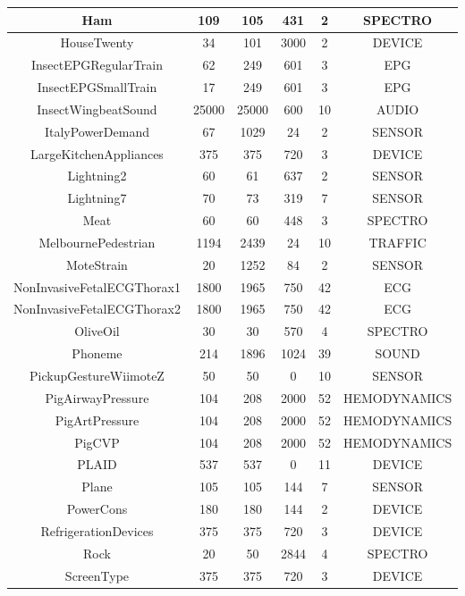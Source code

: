 \begin{table}
\begin{center}
\begin{longtable}{||c|c|c|c|c|c||}
 \hline
 Ham & 109 & 105 & 431 & 2 & SPECTRO \\[1ex]
 \hline
 HouseTwenty & 34 & 101 & 3000 & 2 & DEVICE \\[1ex]
 \hline
 InsectEPGRegularTrain & 62 & 249 & 601 & 3 & EPG \\[1ex]
 \hline
 InsectEPGSmallTrain & 17 & 249 & 601 & 3 & EPG \\[1ex]
 \hline
 InsectWingbeatSound & 25000 & 25000 & 600 & 10 & AUDIO \\[1ex]
 \hline
 ItalyPowerDemand & 67 & 1029 & 24 & 2 & SENSOR \\[1ex]
 \hline
 LargeKitchenAppliances & 375 & 375 & 720 & 3 & DEVICE \\[1ex]
 \hline
 Lightning2 & 60 & 61 & 637 & 2 & SENSOR \\[1ex]
 \hline
 Lightning7 & 70 & 73 & 319 & 7 & SENSOR \\[1ex]
 \hline
 Meat & 60 & 60 & 448 & 3 & SPECTRO \\[1ex]
 \hline
 MelbournePedestrian & 1194 & 2439 & 24 & 10 & TRAFFIC \\[1ex]
 \hline
 MoteStrain & 20 & 1252 & 84 & 2 & SENSOR \\[1ex]
 \hline
 NonInvasiveFetalECGThorax1 & 1800 & 1965 & 750 & 42 & ECG \\[1ex]
 \hline
 NonInvasiveFetalECGThorax2 & 1800 & 1965 & 750 & 42 & ECG \\[1ex]
 \hline
 OliveOil & 30 & 30 & 570 & 4 & SPECTRO \\[1ex]
 \hline
 Phoneme & 214 & 1896 & 1024 & 39 & SOUND \\[1ex]
 \hline
 PickupGestureWiimoteZ & 50 & 50 & 0 & 10 & SENSOR \\[1ex]
 \hline
 PigAirwayPressure & 104 & 208 & 2000 & 52 & HEMODYNAMICS \\[1ex]
 \hline
 PigArtPressure & 104 & 208 & 2000 & 52 & HEMODYNAMICS \\[1ex]
 \hline
 PigCVP & 104 & 208 & 2000 & 52 & HEMODYNAMICS \\[1ex]
 \hline
 PLAID & 537 & 537 & 0 & 11 & DEVICE \\[1ex]
 \hline
 Plane & 105 & 105 & 144 & 7 & SENSOR \\[1ex]
 \hline
 PowerCons & 180 & 180 & 144 & 2 & DEVICE \\[1ex]
 \hline
 RefrigerationDevices & 375 & 375 & 720 & 3 & DEVICE \\[1ex]
 \hline
 Rock & 20 & 50 & 2844 & 4 & SPECTRO \\[1ex]
 \hline
 ScreenType & 375 & 375 & 720 & 3 & DEVICE \\[1ex]

\end{longtable}
\end{center}
\end{table}

